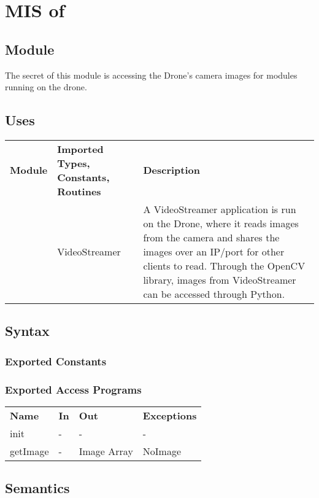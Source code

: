 \documentclass[12pt, titlepage]{article}
\begin{document}
\section{MIS of } \label{MIS_DRONE_CAMERA} 
\subsection{Module}
The secret of this module is accessing the Drone's camera images for modules running on the drone.
\subsection{Uses}
\begin{center}
\begin{tabular}{p{2 cm} p{5cm} p{6.5cm} } 
\hline
\textbf{Module} & \textbf{Imported Types, Constants, Routines} & \textbf{Description} \\
\nameref{GStreamer} & VideoStreamer & A VideoStreamer application is run on the Drone, where it reads images from the camera and shares the images over an IP/port for other clients to read. Through the OpenCV library, images from VideoStreamer can be accessed through Python. \\
\hline
\hline
\end{tabular}
\end{center}
\subsection{Syntax}
\subsubsection{Exported Constants}
\subsubsection{Exported Access Programs}
\begin{center}
\begin{tabular}{p{3.5cm} p{2.5cm} p{2.5cm} p{5cm}} 
\hline
\textbf{Name} & \textbf{In} & \textbf{Out} & \textbf{Exceptions} \\
init & - & - & - \\
getImage & - & Image Array & NoImage \\
\hline
\hline
\end{tabular}
\end{center}
\subsection{Semantics}
\end{document}
